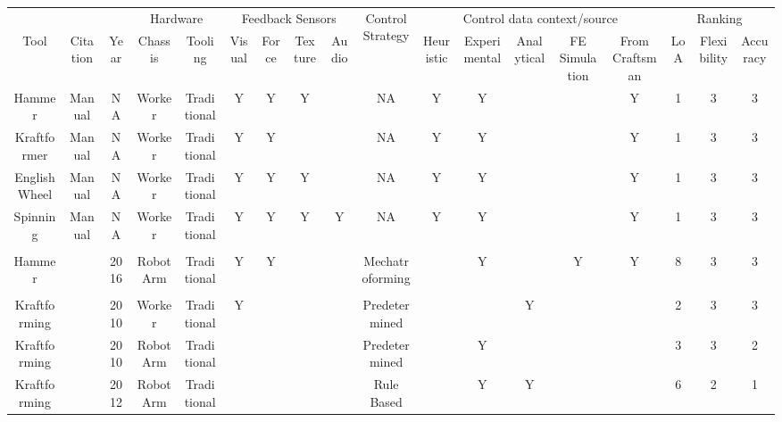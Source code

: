 \begin{tabular}{cccccccccccccccccc} \toprule
                         &                              &                          & \multicolumn{2}{c}{Hardware}  & \multicolumn{4}{c}{Feedback Sensors} & \multirow{2}{*}{Control Strategy}  & \multicolumn{5}{c}{Control data   context/source} & \multicolumn{3}{c}{Ranking} \\
\cmidrule(lr){4-5}\cmidrule(lr){6-9}\cmidrule(lr){11-15}\cmidrule(lr){16-18} 
\multicolumn{1}{c}{Tool} & \multicolumn{1}{c}{Citation} & \multicolumn{1}{c}{Year} & Chassis & Tooling     & Visual  & Force  & Texture  & Audio  &    & Heuristic & Experimental & Analytical & FE Simulation & From Craftsman & LoA & Flexibility & Accuracy \\
\midrule
Hammer        & Manual                   & NA   & Worker    & Traditional & Y & Y & Y &   & NA              & Y & Y &   &   & Y & 1 & 3 & 3 \\
Kraftformer   & Manual                   & NA   & Worker    & Traditional & Y & Y &   &   & NA              & Y & Y &   &   & Y & 1 & 3 & 3 \\
English Wheel & Manual                   & NA   & Worker    & Traditional & Y & Y & Y &   & NA              & Y & Y &   &   & Y & 1 & 3 & 3 \\
Spinning      & Manual                   & NA   & Worker    & Traditional & Y & Y & Y & Y & NA              & Y & Y &   &   & Y & 1 & 3 & 3 \\
              &                          &      &           &             &   &   &   &   &                 &   &   &   &   &   &   &   &   \\
Hammer        & \citep{Ilangovan2016AnForming}           & 2016 & Robot Arm & Traditional & Y & Y &   &   & Mechatroforming &   & Y &   & Y & Y & 8 & 3 & 3 \\
              &                          &      &           &             &   &   &   &   &                 &   &   &   &   &   &   &   &   \\
Kraftforming  & \citep{Scherer2010DrivingProducts}              & 2010 & Worker    & Traditional & Y &   &   &   & Predetermined   &   &   & Y &   &   & 2 & 3 & 3 \\
Kraftforming  & \citep{Hoffman2009AnHandling}                      & 2010 & Robot Arm & Traditional &   &   &   &   & Predetermined   &   & Y &   &   &   & 3 & 3 & 2 \\
Kraftforming  & \citep{Opritescu2012AutomatedStrategy}            & 2012 & Robot Arm & Traditional &   &   &   &   & Rule Based      &   & Y & Y &   &   & 6 & 2 & 1 \\

\end{tabular}

